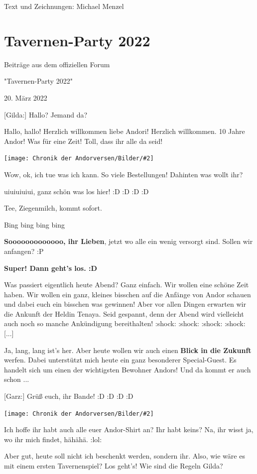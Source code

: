 \documentclass[10pt, a4paper, oneside]{book}
\newcommand{\fillbreak}{\vspace*{\fill}\columnbreak}
\newcommand{\storytext}[1]{%
    \section{#1}%
    \label{Storytext: #1}%
}
\newcommand{\bildmitts}[2][height=0.32\textwidth,width=0.48\textwidth,keepaspectratio]{%
    \begin{center}
        \texttt{[image: Chronik der Andorversen/Bilder/\#2]}
    \end{center}
}
\begin{document}
\begin{multicols}{2}

Text und Zeichnungen: Michael Menzel




\fillbreak
\storytext{Tavernen-Party 2022}

\begin{center}
    Beiträge aus dem offiziellen Forum

    "Tavernen-Party 2022"

    20. März 2022
\end{center}

[Gilda:] Hallo? Jemand da?

Hallo, hallo! Herzlich willkommen liebe Andori! Herzlich willkommen. 10 Jahre Andor! Was für eine Zeit! Toll, dass ihr alle da seid!

\bildmitts{AA2022 Tavernen-Party 1.jpeg}



Wow, ok, ich tue was ich kann. So viele Bestellungen! Dahinten was wollt ihr?

uiuiuiuiui, ganz schön was los hier! :D :D :D :D

Tee, Ziegenmilch, kommt sofort.

Bing bing bing bing

\textbf{Sooooooooooooo, ihr Lieben}, jetzt wo alle ein wenig versorgt sind. Sollen wir anfangen? :P

\textbf{Super! Dann geht's los. :D}

Was passiert eigentlich heute Abend? Ganz einfach. Wir wollen eine schöne Zeit haben. Wir wollen ein ganz, kleines bisschen auf die Anfänge von Andor schauen und dabei euch ein bisschen was gewinnen! Aber vor allen Dingen erwarten wir die Ankunft der Heldin Tenaya. Seid gespannt, denn der Abend wird vielleicht auch noch so manche Ankündigung bereithalten! :shock: :shock: :shock: :shock: [...]

Ja, lang, lang ist’s her. Aber heute wollen wir auch einen \textbf{Blick in die Zukunft} werfen. Dabei unterstützt mich heute ein ganz besonderer Special-Guest. Es handelt sich um einen der wichtigsten Bewohner Andors! Und da kommt er auch schon ...

[Garz:] Grüß euch, ihr Bande! :D :D :D :D

\bildmitts{AA2022 Tavernen-Party 2.jpeg}

Ich hoffe ihr habt auch alle euer Andor-Shirt an? Ihr habt keins? Na, ihr wisst ja, wo ihr mich findet, hähähä. :lol:

Aber gut, heute soll nicht ich beschenkt werden, sondern ihr. Also, wie wäre es mit einem ersten Tavernenspiel? Los geht’s! Wie sind die Regeln Gilda?


\end{multicols}
\end{document}
